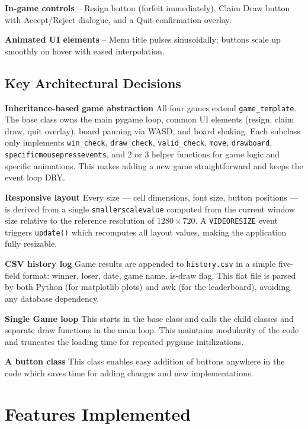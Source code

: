 \documentclass[12pt]{article}
\begin{document}
\textbf{In-game controls} -- Resign button (forfeit immediately), Claim Draw button with Accept/Reject dialogue, and a Quit confirmation overlay.

\textbf{Animated UI elements} -- Menu title pulses sinusoidally; buttons scale up smoothly on hover with eased interpolation.

  

\subsection{Key Architectural Decisions}

\textbf{Inheritance-based game abstraction} All four games extend \texttt{game\_template}. The base class owns the main pygame loop, common UI elements (resign, claim draw, quit overlay), board panning via WASD, and board shaking. Each subclass only implements \texttt{win\_check}, \texttt{draw\_check}, \texttt{valid\_check}, \texttt{move}, \texttt{drawboard}, \texttt{specificmousepressevents}, and 2 or 3 helper functions for game logic and specific animations. This makes adding a new game straightforward and keeps the event loop DRY.

\textbf{Responsive layout} Every size — cell dimensions, font size, button positions — is derived from a single \texttt{smallerscalevalue} computed from the current window size relative to the reference resolution of $1280 \times 720$. A \texttt{VIDEORESIZE} event triggers \texttt{update()} which recomputes all layout values, making the application fully resizable.

\textbf{CSV history log} Game results are appended to \texttt{history.csv} in a simple five-field format: winner, loser, date, game name, is-draw flag. This flat file is parsed by both Python (for matplotlib plots) and awk (for the leaderboard), avoiding any database dependency.

\textbf{Single Game loop} This starts in the base class and calls the child classes and separate draw functions in the main loop. This maintains modularity of the code and truncates the loading time for repeated pygame initilizations.

\textbf{A button class} This class enables easy addition of buttons anywhere in the code which saves time for adding changes and new implementations.

\section{Features Implemented}
\end{document}
